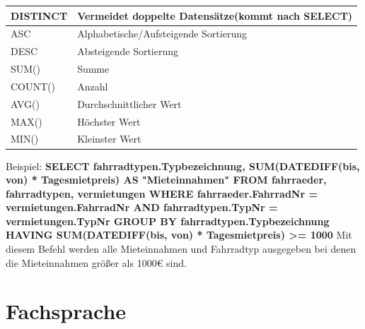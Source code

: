 \documentclass[12pt,a4paper]{article}
\begin{document}
    \begin{table}[h]
        \centering
        \begin{tabularx}{17cm}{|X|X|}
            \hline
            DISTINCT & Vermeidet doppelte Datensätze(kommt nach SELECT)\\
            \hline
            ASC & Alphabetische/Aufsteigende Sortierung\\
            \hline
            DESC & Absteigende Sortierung\\
            \hline
            SUM() & Summe\\
            \hline
            COUNT() & Anzahl\\
            \hline
            AVG() & Durchschnittlicher Wert\\
            \hline
            MAX() & Höchster Wert\\
            \hline
            MIN() & Kleinster Wert\\
            \hline
        \end{tabularx}
    \end{table}
    \vspace{0.5cm}\newline
    Beispiel:\newline
    \textbf{SELECT fahrradtypen.Typbezeichnung, SUM(DATEDIFF(bis, von) * Tagesmietpreis) AS "Mieteinnahmen"\newline
    FROM fahrraeder, fahrradtypen, vermietungen\newline
    WHERE fahrraeder.FahrradNr = vermietungen.FahrradNr\newline
    AND fahrradtypen.TypNr = vermietungen.TypNr\newline
    GROUP BY fahrradtypen.Typbezeichnung\newline
    HAVING SUM(DATEDIFF(bis, von) * Tagesmietpreis) >= 1000}\newline
    \vspace{0.5cm}\newline
    Mit diesem Befehl werden alle Mieteinnahmen und Fahrradtyp ausgegeben bei denen die Mieteinnahmen größer als 1000€ sind.

\section{Fachsprache}
\end{document}
